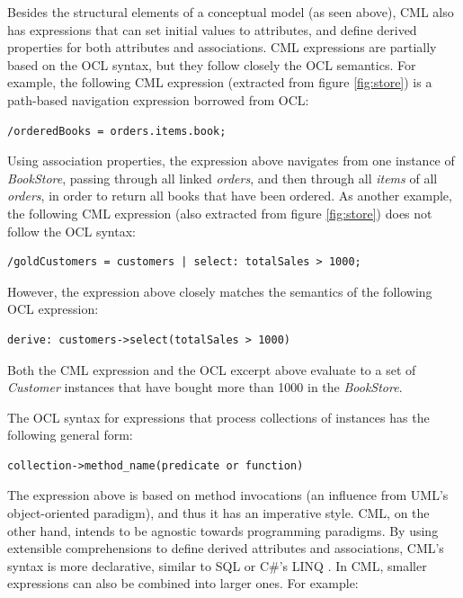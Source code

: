 Besides the structural elements of a conceptual model (as seen above),
CML also has expressions that can set initial values to attributes,
and define derived properties for both attributes and associations.
CML expressions are partially based on the OCL \cite{ocl} syntax,
but they follow closely the OCL semantics.
For example,
the following CML expression (extracted from figure \ref{fig:store}) is
a path-based navigation expression borrowed from OCL:

\verbatimfont{\small}
\begin{verbatim}
/orderedBooks = orders.items.book;
\end{verbatim}

Using association properties,
the expression above navigates from one instance of \emph{BookStore},
passing through all linked \emph{orders},
and then through all \emph{items} of all \emph{orders},
in order to return all books that have been ordered.
As another example, the following CML expression
(also extracted from figure \ref{fig:store}) does not follow the OCL syntax:

\verbatimfont{\small}
\begin{verbatim}
/goldCustomers = customers | select: totalSales > 1000;
\end{verbatim}

However, the expression above closely matches the semantics of the following OCL expression:

\verbatimfont{\small}
\begin{verbatim}
derive: customers->select(totalSales > 1000)
\end{verbatim}

Both the CML expression and the OCL excerpt above evaluate to a set of \emph{Customer} instances
that have bought more than 1000 in the \emph{BookStore}.

The OCL syntax for expressions that process collections of instances has the following general form:

\verbatimfont{\small}
\begin{verbatim}
collection->method_name(predicate or function)
\end{verbatim}

The expression above is based on method invocations
(an influence from UML's object-oriented paradigm),
and thus it has an imperative style.
CML, on the other hand, intends to be agnostic towards programming paradigms.
By using extensible comprehensions \cite{trinder}
to define derived attributes and associations,
CML's syntax is more declarative,
similar to SQL \cite{sql} or C\#'s LINQ \cite{torgersen}.
In CML, smaller expressions can also be combined into larger ones. For example:

